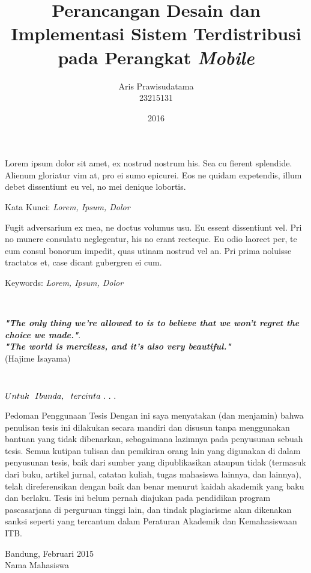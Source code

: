 \documentclass[12pt,a4paper,oneside]{book}
\title{Perancangan Desain dan Implementasi Sistem Terdistribusi pada Perangkat \textit{Mobile}}
\author{Aris Prawisudatama\\23215131}
\date{2016}
\numberwithin{equation}{chapter}
\begin{document}
\frontmatter
{}
\makecustompengesahan

\begin{abstrak}[indo]
Lorem ipsum dolor sit amet, ex nostrud nostrum his. Sea cu fierent splendide. Alienum gloriatur vim at, pro ei sumo epicurei. Eos ne quidam expetendis, illum debet dissentiunt eu vel, no mei denique lobortis.

Kata Kunci: \textit{Lorem, Ipsum, Dolor}

\end{abstrak}
\begin{abstrak}[english]
Fugit adversarium ex mea, ne doctus volumus usu. Eu essent dissentiunt vel. Pri no munere consulatu neglegentur, his no erant recteque. Eu odio laoreet per, te eum consul bonorum impedit, quas utinam nostrud vel an. Pri prima noluisse tractatos et, case dicant gubergren ei cum.
  
Keywords: \textit{Lorem, Ipsum, Dolor}
\end{abstrak}

\
\vspace{5cm}

\begin{center}
\textbf{\textit{"The only thing we're allowed to is to believe that we won't regret the choice we made."}}. \\
\textbf{\textit{"The world is merciless, and it's also very beautiful."}} \\
(Hajime Isayama)
\end{center}

\
\vspace{9cm}

\begin{flushright}
\textbf{\large{$\mathnormal{Untuk \  \ Ibunda, \ \ tercinta \ . \ . \ .}$}}
\end{flushright}


    
\begin{custompage}{Pedoman Penggunaan Tesis}
Dengan ini saya menyatakan (dan menjamin) bahwa penulisan tesis ini dilakukan secara mandiri dan disusun tanpa menggunakan bantuan yang tidak dibenarkan, sebagaimana lazimnya pada penyusunan sebuah tesis. Semua kutipan tulisan dan pemikiran orang lain yang digunakan di dalam penyusunan tesis, baik dari sumber yang dipublikasikan ataupun tidak (termasuk dari buku, artikel jurnal, catatan kuliah, tugas mahasiswa lainnya, dan lainnya), telah direferensikan dengan baik dan benar menurut kaidah akademik yang baku dan berlaku. Tesis ini belum pernah diajukan pada pendidikan program pascasarjana di perguruan tinggi lain, dan tindak plagiarisme akan dikenakan sanksi seperti yang tercantum dalam Peraturan Akademik dan Kemahasiswaan ITB.

\begin{flushright}
Bandung, Februari 2015\\[2cm]
Nama Mahasiswa
\end{flushright} 
\end{custompage}
\end{document}
